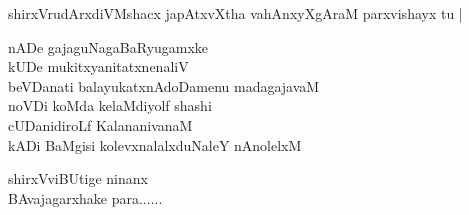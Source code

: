 \begin{entry}
\begin{shl}
shirxVrudArxdiVMshacx japAtxvXtha vahAnxyXgAraM parxvishayx tu |
\end{shl}
\end{entry}

\begin{entry}
\gl{}
\begin{shl}
nADe gajaguNagaBaRyugamxke\\
kUDe mukitxyanitatxnenaliV\\
beVDanati balayukatxnAdoDamenu madagajavaM\\
noVDi koMda kelaMdiyolf shashi\\
cUDanidiroLf KalananivanaM\\
kADi BaMgisi kolevxnalalxduNaleY nAnolelxM
\end{shl}
\end{entry}

\begin{entry}
\gl{}
\gl{}
\begin{shl}
shirxVviBUtige ninanx\\
BAvajagarxhake para......
\end{shl}
\end{entry}

